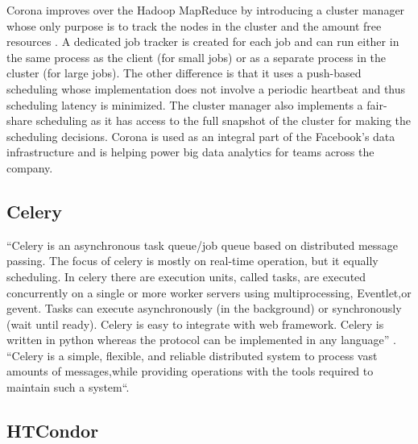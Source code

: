 {     Corona improves over the Hadoop MapReduce by introducing a
     cluster manager whose only purpose is to track the nodes in the
     cluster and the amount free resources
     \cite{www-facebook-corona}. A dedicated job tracker is created
     for each job and can run either in the same process as the
     client (for small jobs) or as a separate process in the cluster
     (for large jobs). The other difference is that it uses a
     push-based scheduling whose implementation does not involve a
     periodic heartbeat and thus scheduling latency is minimized. The
     cluster manager also implements a fair-share scheduling as it has
     access to the full snapshot of the cluster for making the
     scheduling decisions. Corona is used as an integral part of the
     Facebook's data infrastructure and is helping power big data
     analytics for teams across the company.
     
\subsection{Celery}

     ``Celery is an asynchronous task queue/job queue based on
     distributed message passing.  The focus of celery is mostly on
     real-time operation, but it equally scheduling.  In celery there
     are execution units, called tasks, are executed concurrently on a
     single or more worker servers using multiprocessing, Eventlet,or
     gevent.  Tasks can execute asynchronously (in the background) or
     synchronously (wait until ready).  Celery is easy to integrate
     with web framework. Celery is written in python whereas the
     protocol can be implemented in any language'' \cite{celery}. ``Celery
     is a simple, flexible, and reliable distributed system to process
     vast amounts of messages,while providing operations with the
     tools required to maintain such a system``\cite{celerydocs}.

     \pv

     
\subsection{HTCondor}

}
